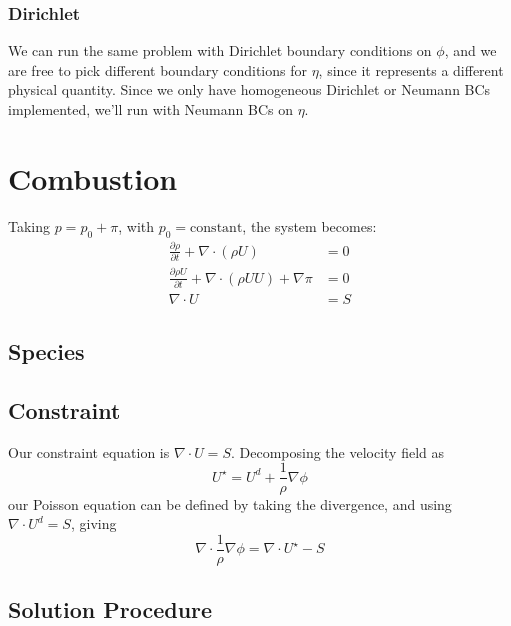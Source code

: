 \subsubsection{Dirichlet}

We can run the same problem with Dirichlet boundary conditions on $\phi$,
and we are free to pick different boundary conditions for $\eta$, since
it represents a different physical quantity.  Since we only have homogeneous
Dirichlet or Neumann BCs implemented, we'll run with Neumann BCs on $\eta$.

\section{Combustion}


Taking $p = p_0 + \pi$, with $p_0 = \mathrm{constant}$, the system 
becomes:
\begin{align}
\frac{\partial \rho}{\partial t} + \nabla \cdot (\rho U) &= 0 \\
\frac{\partial \rho U}{\partial t} + \nabla \cdot (\rho U U) + \nabla \pi &= 0 \\
\nabla \cdot U &= S
\end{align}

\subsection{Species}


\subsection{Constraint}

Our constraint equation is $\nabla \cdot U = S$.  Decomposing the
velocity field as
\begin{equation}
U^\star = U^d + \frac{1}{\rho} \nabla \phi
\end{equation}
our Poisson equation can be defined by taking the divergence, and
using $\nabla \cdot U^d = S$, giving
\begin{equation}
\nabla \cdot \frac{1}{\rho} \nabla \phi = \nabla \cdot U^\star - S
\end{equation}


\subsection{Solution Procedure}

